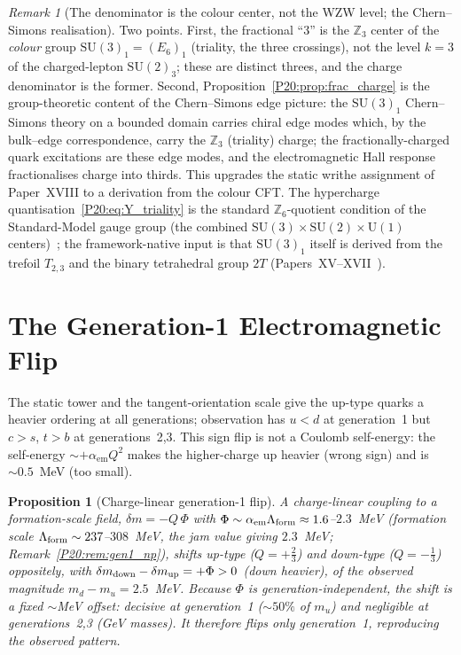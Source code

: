 \documentclass[11pt,a4paper]{article}
\newtheorem{proposition}[theorem]{Proposition}
\theoremstyle{definition}\newtheorem{definition}[theorem]{Definition}
\theoremstyle{remark}
\newtheorem{remark}[theorem]{Remark}
\newcommand{\SU}{\mathrm{SU}}
\newcommand{\twoT}{2T}
\newcommand{\Zthree}{\mathbb{Z}_3}
\newcommand{\alphaem}{\alpha_{\mathrm{em}}}
\begin{document}
\begin{remark}[The denominator is the colour center, not the WZW level; the Chern--Simons realisation]
\label{P20:rem:charge_cs}
Two points. First, the fractional ``$3$'' is the $\Zthree$ center of the
\emph{colour} group $\SU(3)_1=(E_6)_1$ (triality, the three crossings),
not the level $k=3$ of the charged-lepton $\SU(2)_3$; these are distinct
threes, and the charge denominator is the former. Second,
Proposition~\ref{P20:prop:frac_charge} is the group-theoretic content of
the Chern--Simons edge picture: the $\SU(3)_1$ Chern--Simons theory on a
bounded domain carries chiral edge modes which, by the bulk--edge
correspondence, carry the $\Zthree$ (triality) charge; the
fractionally-charged quark excitations are these edge modes, and the
electromagnetic Hall response fractionalises charge into thirds. This
upgrades the static writhe assignment of Paper~XVIII to a derivation
from the colour CFT. %
The hypercharge quantisation~\eqref{P20:eq:Y_triality} is the standard
$\mathbb{Z}_6$-quotient condition of the Standard-Model gauge group
(the combined $\SU(3)\times\SU(2)\times\mathrm{U}(1)$
centers)~\cite{FracCharge2024}; the framework-native input is that
$\SU(3)_1$ itself is derived from the trefoil $T_{2,3}$ and the binary
tetrahedral group $\twoT$
(Papers~XV--XVII~\cite{Paper15,Paper16,Paper17}).
\end{remark}

\section{The Generation-1 Electromagnetic Flip}
\label{P20:sec:gen1}

The static tower and the tangent-orientation scale give the up-type
quarks a heavier ordering at all generations; observation has $u<d$ at
generation~1 but $c>s$, $t>b$ at generations~2,3. This sign flip is not
a Coulomb self-energy: the self-energy $\sim+\alphaem Q^2$ makes the
higher-charge up heavier (wrong sign) and is $\sim0.5$~MeV (too small).

\begin{proposition}[Charge-linear generation-1 flip]
\label{P20:prop:gen1_flip}
A charge-linear coupling to a formation-scale field,
$\delta m=-Q\,\Phi$ with $\Phi\sim\alphaem\Lambda_{\rm form}
\approx1.6$--$2.3$~MeV (formation scale $\Lambda_{\rm form}\sim237$--$308$~MeV,
the jam value giving $2.3$~MeV; Remark~\ref{P20:rem:gen1_np}), shifts up-type
($Q=+\tfrac23$) and down-type ($Q=-\tfrac13$) oppositely, with
$\delta m_{\rm down}-\delta m_{\rm up}=+\Phi>0$ (down heavier), of the observed
magnitude $m_d-m_u=2.5$~MeV.
Because $\Phi$ is generation-independent, the shift is a fixed
$\sim$MeV offset: decisive at generation~1 ($\sim50\%$ of $m_u$) and
negligible at generations~2,3 (GeV masses). It therefore flips only
generation~1, reproducing the observed pattern.
\end{proposition}
\end{document}
